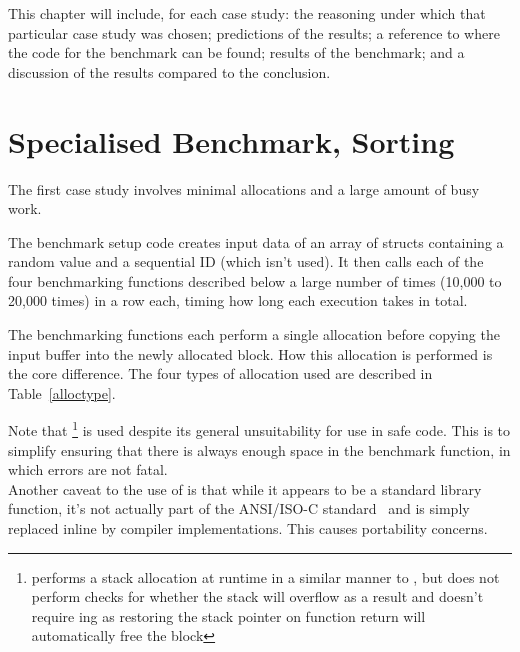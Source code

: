 This chapter will include, for each case study: the reasoning under which that particular case study was chosen; predictions of the results; a reference to where the code for the benchmark can be found; results of the benchmark; and a discussion of the results compared to the conclusion.

\section{Specialised Benchmark, Sorting}

The first case study involves minimal allocations and a large amount of busy work.

The benchmark setup code creates input data of an array of structs containing a random value and a sequential ID (which isn't used). It then calls each of the four benchmarking functions described below a large number of times (10,000 to 20,000 times) in a row each, timing how long each execution takes in total.

The benchmarking functions each perform a single allocation before copying the input buffer into the newly allocated block. How this allocation is performed is the core difference. The four types of allocation used are described in Table~\ref{alloctype}.

Note that \footnote{ performs a stack allocation at runtime in a similar manner to \malloc{}, but does not perform checks for whether the stack will overflow as a result and doesn't require \free{}ing as restoring the stack pointer on function return will automatically free the block} is used despite its general unsuitability for use in safe code. This is to simplify ensuring that there is always enough space in the  benchmark function, in which errors are not fatal.\\
Another caveat to the use of  is that while it appears to be a standard library function, it's not actually part of the ANSI/ISO-C standard~\cite{c11std} and is simply replaced inline by compiler implementations. This causes portability concerns.

